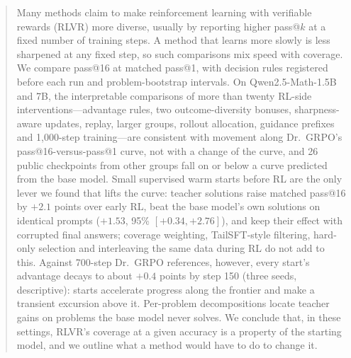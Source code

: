 \documentclass{article}
\theoremstyle{plain}
\begin{document}
\printAffiliationsAndNotice{}

\begin{abstract}
Many methods claim to make reinforcement learning with verifiable rewards (RLVR) more diverse, usually by reporting
higher pass@$k$ at a fixed number of training steps. A method that learns more slowly is less sharpened at any fixed
step, so such comparisons mix speed with coverage. We compare pass@16 at matched pass@1, with decision rules
registered before each run and problem-bootstrap intervals. On Qwen2.5-Math-1.5B and 7B, the interpretable
comparisons of more than twenty RL-side interventions---advantage rules, two outcome-diversity bonuses,
sharpness-aware updates, replay, larger groups, rollout allocation, guidance prefixes and 1,000-step training---are
consistent with movement along Dr.\ GRPO's pass@16-versus-pass@1 curve, not with a change of the curve, and 26 public
checkpoints from other groups fall on or below a curve predicted from the base model. Small supervised warm starts
before RL are the only lever we found that lifts the curve: teacher solutions raise matched pass@16 by $+2.1$ points
over early RL, beat the base model's own solutions on identical prompts ($+1.53$, 95\% $[+0.34,+2.76]$), and keep
their effect with corrupted final answers; coverage weighting, TailSFT-style filtering, hard-only selection and
interleaving the same data during RL do not add to this. Against 700-step Dr.\ GRPO references, however, every start's
advantage decays to about $+0.4$ points by step 150 (three seeds, descriptive): starts accelerate progress along the
frontier and make a transient excursion above it. Per-problem decompositions locate teacher gains on problems the base model never
solves. We conclude that, in these settings, RLVR's coverage at a given accuracy is a property of the starting model,
and we outline what a method would have to do to change it.
\end{abstract}
\end{document}
